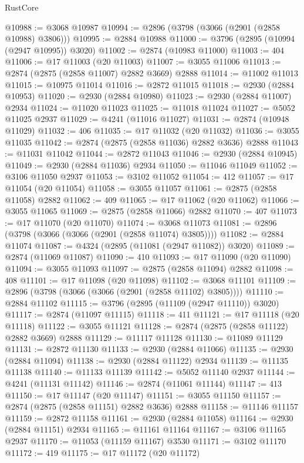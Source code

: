 \begin{lexlean}{RustCore}
\begin{coremodule}
@10988 := @3068 @10987
@10994 := @2896 (@3798 (@3066 (@2901 (@2858 @10988) @3806)))
@10995 := @2884 @10988
@11000 := @3796 (@2895 (@10994 (@2947 @10995)) @3020)
@11002 := @2874 (@10983 @11000)
@11003 := 404
@11006 := @17 @11003 (@20 @11003)
@11007 := @3055 @11006
@11013 := @2874 (@2875 (@2858 @11007) @2882 @3669) @2888
@11014 := @11002 @11013
@11015 := @10975 @11014
@11016 := @2872 @11015
@11018 := @2930 (@2884 @10953)
@11020 := @2930 (@2884 @10980)
@11023 := @2930 (@2884 @11007) @2934
@11024 := @11020 @11023
@11025 := @11018 @11024
@11027 := @5052 @11025 @2937
@11029 := @4241 (@11016 @11027)
@11031 := @2874 (@10948 @11029)
@11032 := 406
@11035 := @17 @11032 (@20 @11032)
@11036 := @3055 @11035
@11042 := @2874 (@2875 (@2858 @11036) @2882 @3636) @2888
@11043 := @11031 @11042
@11044 := @2872 @11043
@11046 := @2930 (@2884 @10945)
@11049 := @2930 (@2884 @11036) @2934
@11050 := @11046 @11049
@11052 := @3106 @11050 @2937
@11053 := @3102 @11052
@11054 := 412
@11057 := @17 @11054 (@20 @11054)
@11058 := @3055 @11057
@11061 := @2875 (@2858 @11058) @2882
@11062 := 409
@11065 := @17 @11062 (@20 @11062)
@11066 := @3055 @11065
@11069 := @2875 (@2858 @11066) @2882
@11070 := 407
@11073 := @17 @11070 (@20 @11070)
@11074 := @3068 @11073
@11081 := @2896 (@3798 (@3066 (@3066 (@2901 (@2858 @11074) @3805))))
@11082 := @2884 @11074
@11087 := @4324 (@2895 (@11081 (@2947 @11082)) @3020)
@11089 := @2874 (@11069 @11087)
@11090 := 410
@11093 := @17 @11090 (@20 @11090)
@11094 := @3055 @11093
@11097 := @2875 (@2858 @11094) @2882
@11098 := 408
@11101 := @17 @11098 (@20 @11098)
@11102 := @3068 @11101
@11109 := @2896 (@3798 (@3066 (@3066 (@2901 (@2858 @11102) @3805))))
@11110 := @2884 @11102
@11115 := @3796 (@2895 (@11109 (@2947 @11110)) @3020)
@11117 := @2874 (@11097 @11115)
@11118 := 411
@11121 := @17 @11118 (@20 @11118)
@11122 := @3055 @11121
@11128 := @2874 (@2875 (@2858 @11122) @2882 @3669) @2888
@11129 := @11117 @11128
@11130 := @11089 @11129
@11131 := @2872 @11130
@11133 := @2930 (@2884 @11066)
@11135 := @2930 (@2884 @11094)
@11138 := @2930 (@2884 @11122) @2934
@11139 := @11135 @11138
@11140 := @11133 @11139
@11142 := @5052 @11140 @2937
@11144 := @4241 (@11131 @11142)
@11146 := @2874 (@11061 @11144)
@11147 := 413
@11150 := @17 @11147 (@20 @11147)
@11151 := @3055 @11150
@11157 := @2874 (@2875 (@2858 @11151) @2882 @3636) @2888
@11158 := @11146 @11157
@11159 := @2872 @11158
@11161 := @2930 (@2884 @11058)
@11164 := @2930 (@2884 @11151) @2934
@11165 := @11161 @11164
@11167 := @3106 @11165 @2937
@11170 := @11053 (@11159 @11167) @3530
@11171 := @3102 @11170
@11172 := 419
@11175 := @17 @11172 (@20 @11172)

\end{coremodule}
\end{lexlean}
